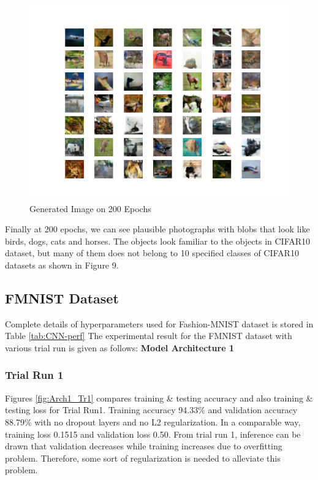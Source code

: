 \documentclass{article}
\begin{document}
\begin{figure}[H]
    \centering
    \includegraphics[width=\textwidth]{e200.png}
    \caption{Generated Image on 200 Epochs}
    \label{fig:compute}
\end{figure}
Finally at 200 epochs, we can see plausible photographs with blobs that look like birds, dogs, cats and horses. The objects look familiar to the objects in CIFAR10 dataset, but many of them does not belong to 10 specified classes of CIFAR10 datasets as shown in Figure 9.


\iffalse
\subsection{FMNIST Dataset}
Complete details of hyperparameters used for Fashion-MNIST dataset is stored in Table \ref{tab:CNN-perf} \newline
The experimental result for the FMNIST dataset with various trial run is given as follows:
\vspace{5 mm}
\newline
\textbf{Model Architecture 1}
\subsubsection{Trial Run 1}

Figures \ref{fig:Arch1_Tr1} compares training & testing accuracy and also training & testing loss for Trial Run1. Training accuracy 94.33\% and validation accuracy 88.79\% with no dropout layers and no L2 regularization. In a comparable way, training loss 0.1515 and validation loss 0.50. From trial run 1, inference can be drawn that validation decreases while training increases due to overfitting problem. Therefore, some sort of regularization is needed to alleviate this problem.
\end{document}
